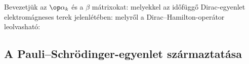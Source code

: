    Bevezetjük az $\op\alpha_k$ és a $\beta$ mátrixokat:
   melyekkel az időfüggő Dirac-egyenlet elektromágneses terek jelenlétében:
   melyről a Dirac--Hamilton-operátor leolvasható:

  \subsection{A Pauli--Schrödinger-egyenlet származtatása}
   
